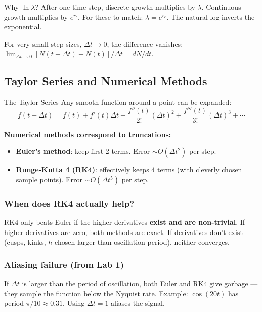 \documentclass[11pt]{article}
\begin{document}
\begin{intuitionbox}{Why $\ln \lambda$?}
After one time step, discrete growth multiplies by $\lambda$. Continuous growth multiplies by $e^{r_c}$. For these to match: $\lambda = e^{r_c}$. The natural log inverts the exponential.

For very small step sizes, $\Delta t \to 0$, the difference vanishes: $\lim_{\Delta t \to 0}[N(t+\Delta t) - N(t)]/\Delta t = dN/dt$.
\end{intuitionbox}

\subsection{Taylor Series and Numerical Methods}

\begin{conceptbox}{The Taylor Series}
Any smooth function around a point can be expanded:
\[
f(t + \Delta t) = f(t) + f'(t)\Delta t + \frac{f''(t)}{2!}(\Delta t)^2 + \frac{f'''(t)}{3!}(\Delta t)^3 + \cdots
\]

\textbf{Numerical methods correspond to truncations:}
\begin{itemize}
\item \textbf{Euler's method}: keep first 2 terms. Error $\sim O(\Delta t^2)$ per step.
\item \textbf{Runge-Kutta 4 (RK4)}: effectively keeps 4 terms (with cleverly chosen sample points). Error $\sim O(\Delta t^5)$ per step.
\end{itemize}
\end{conceptbox}

\subsubsection{When does RK4 actually help?} RK4 only beats Euler if the higher derivatives \textbf{exist and are non-trivial}. If higher derivatives are zero, both methods are exact. If derivatives don't exist (cusps, kinks, $h$ chosen larger than oscillation period), neither converges.

\subsubsection{Aliasing failure (from Lab 1)} If $\Delta t$ is larger than the period of oscillation, both Euler and RK4 give garbage --- they sample the function below the Nyquist rate. Example: $\cos(20t)$ has period $\pi/10 \approx 0.31$. Using $\Delta t = 1$ aliases the signal.
\end{document}
